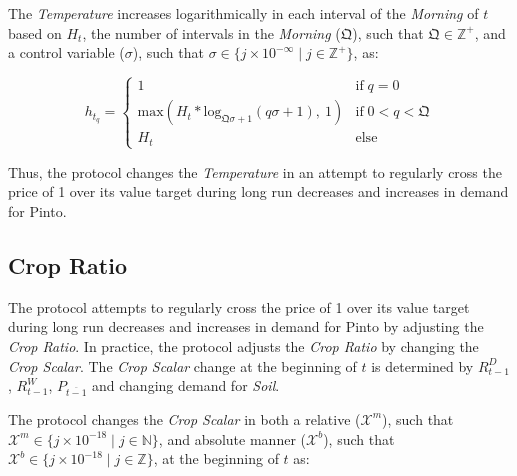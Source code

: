 \documentclass[tikz]{article}
\newcommand{\term}[1]{\textsl{#1}}
\newcommand{\Pinto}{} %
\begin{document}
The \term{Temperature} increases logarithmically in each interval of the \term{Morning} of $t$ based on $H_{t}$, the number of intervals in the \term{Morning} ($\mathfrak{Q}$), such that $\mathfrak{Q} \in \mathbb{Z}^{+}$, and a control variable ($\sigma$), such that $\sigma \in \{j \times 10^{-\infty} \mid j \in \mathbb{Z}^{+} \}$, as:

\vspace{-0.025cm}

    $$ 
        h_{t_{q}} =
            \begin{cases}
                1
                    & \text{if} \; q = 0 \\
                    
                \text{max}(
                        H_{t}*\text{log}_{\mathfrak{Q}\sigma + 1}(q\sigma + 1),\ 
                        1)
                    & \text{if} \; 0 < q < \mathfrak{Q} \\
                    
                H_{t} 
                    & \text{else}
            \end{cases} 
    $$

\vspace{-0.025cm}

Thus, the protocol changes the \term{Temperature} in an attempt to regularly cross the price of \Pinto1 over its value target during long run decreases and increases in demand for Pinto.


\vspace{-0.025cm}
\subsection{Crop Ratio}
\vspace{-0.025cm}

The protocol attempts to regularly cross the price of \Pinto1 over its value target during long run decreases and increases in demand for Pinto by adjusting the \term{Crop Ratio}. In practice, the protocol adjusts the \term{Crop Ratio} by changing the \term{Crop Scalar}. The \term{Crop Scalar} change at the beginning of $t$ is determined by $R_{t-1}^{D}$, $R_{t-1}^{W}$, $P_{\overline{t-1}}$ and changing demand for \term{Soil}. 

\vspace{-0.025cm}

The protocol changes the \term{Crop Scalar} in both a relative ($\mathscr{X}^{m}$), such that $\mathscr{X}^{m} \in \{j \times 10^{-18} \mid j \in \mathbb{N} \}$, and absolute manner ($\mathscr{X}^{b}$), such that $\mathscr{X}^{b} \in \{j \times 10^{-18} \mid j \in \mathbb{Z} \}$, at the beginning of $t$ as:
\end{document}
